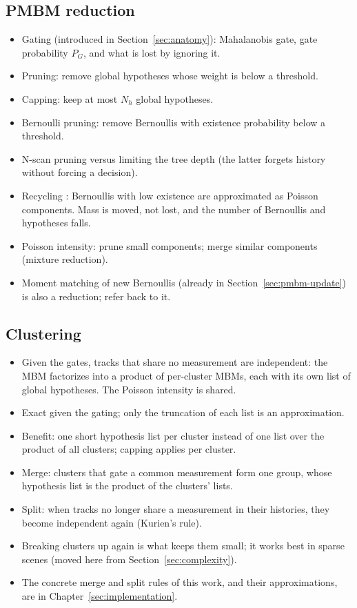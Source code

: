 \subsection{PMBM reduction}
\label{sec:pmbm-reduction}
\begin{itemize}
    \item Gating (introduced in Section~\ref{sec:anatomy}): Mahalanobis gate, gate probability $P_G$, and what is lost by ignoring it.
    \item Pruning: remove global hypotheses whose weight is below a threshold.
    \item Capping: keep at most $N_h$ global hypotheses.
    \item Bernoulli pruning: remove Bernoullis with existence probability below a threshold.
    \item N-scan pruning versus limiting the tree depth (the latter forgets history without forcing a decision).
    \item Recycling \cite{williams_pmbm_2015}: Bernoullis with low existence are approximated as Poisson components. Mass is moved, not lost, and the number of Bernoullis and hypotheses falls.
    \item Poisson intensity: prune small components; merge similar components (mixture reduction).
    \item Moment matching of new Bernoullis (already in Section~\ref{sec:pmbm-update}) is also a reduction; refer back to it.
\end{itemize}

\subsection{Clustering}
\label{sec:pmbm-clustering}
\begin{itemize}
    \item Given the gates, tracks that share no measurement are independent: the MBM factorizes into a product of per-cluster MBMs, each with its own list of global hypotheses. The Poisson intensity is shared.
    \item Exact given the gating; only the truncation of each list is an approximation.
    \item Benefit: one short hypothesis list per cluster instead of one list over the product of all clusters; capping applies per cluster.
    \item Merge: clusters that gate a common measurement form one group, whose hypothesis list is the product of the clusters' lists.
    \item Split: when tracks no longer share a measurement in their histories, they become independent again (Kurien's rule).
    \item Breaking clusters up again is what keeps them small; it works best in sparse scenes (moved here from Section~\ref{sec:complexity}).
    \item The concrete merge and split rules of this work, and their approximations, are in Chapter~\ref{sec:implementation}.
\end{itemize}

